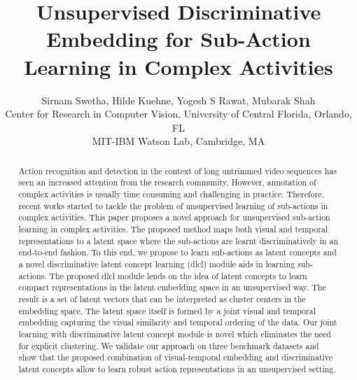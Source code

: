 \documentclass[final]{cvpr}
\begin{document}
\title{Unsupervised Discriminative Embedding for Sub-Action Learning in Complex Activities}

\author{Sirnam Swetha, Hilde Kuehne, Yogesh S Rawat, Mubarak Shah \\
Center for Research in Computer Vision, University of Central Florida, Orlando, FL\\
MIT-IBM Watson Lab, Cambridge, MA\\
}

\maketitle

\begin{abstract}



Action recognition and detection in the context of long untrimmed video sequences has seen an increased attention from the research community. 
However, annotation of complex activities is usually time consuming and challenging in practice.
Therefore, recent works started to tackle the problem of unsupervised learning of sub-actions in complex activities.
This paper proposes a novel approach for unsupervised sub-action learning in complex activities.
The proposed method maps both visual and temporal representations to a latent space where the sub-actions are learnt discriminatively in an end-to-end fashion. 
To this end, we propose to learn sub-actions as latent concepts and a novel discriminative latent concept learning {\sc (dlcl)} module aids in learning sub-actions.
The proposed {\sc dlcl} module lends on the idea of latent concepts to learn compact representations in the latent embedding space in an unsupervised way. 
The result is a set of latent vectors that can be interpreted as cluster centers in the embedding space.
The latent space itself is formed by a joint visual and temporal embedding capturing the visual similarity and temporal ordering of the data. 
Our joint learning with discriminative latent concept module is novel which eliminates the need for explicit clustering.
We validate our approach on three benchmark datasets and show that the proposed combination of visual-temporal embedding and discriminative latent concepts allow to learn robust action representations in an unsupervised setting.


\end{abstract}

\vspace{-0.6cm}
\end{document}
